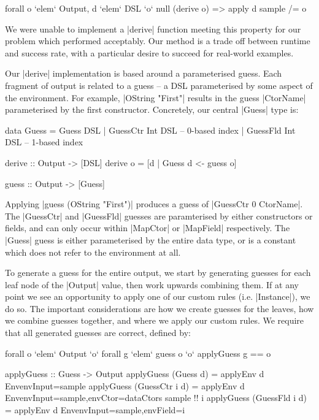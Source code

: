 \documentclass{llncs}
\begin{document}
\ignore\begin{code}
forall o `elem` Output, d `elem` DSL `o` null (derive o) => apply d sample /= o
\end{code}

We were unable to implement a |derive| function meeting this property for our problem which performed acceptably. Our method is a trade off between runtime and success rate, with a particular desire to succeed for real-world examples.

Our |derive| implementation is based around a parameterised guess. Each fragment of output is related to a guess -- a DSL parameterised by some aspect of the environment. For example, |OString "First"| results in the guess |CtorName| parameterised by the first constructor. Concretely, our central |Guess| type is:

\begin{code}
data Guess  =  Guess DSL
            |  GuessCtr Int DSL -- 0-based index
            |  GuessFld Int DSL -- 1-based index

derive :: Output -> [DSL]
derive o = [d | Guess d <- guess o]

guess :: Output -> [Guess]
\end{code}

Applying |guess (OString "First")| produces a guess of |GuessCtr 0 CtorName|. The |GuessCtr| and |GuessFld| guesses are paramterised by either constructors or fields, and can only occur within |MapCtor| or |MapField| respectively. The |Guess| guess is either parameterised by the entire data type, or is a constant which does not refer to the environment at all.

To generate a guess for the entire output, we start by generating guesses for each leaf node of the |Output| value, then work upwards combining them. If at any point we see an opportunity to apply one of our custom rules (i.e. |Instance|), we do so. The important considerations are how we create guesses for the leaves, how we combine guesses together, and where we apply our custom rules. We require that all generated guesses are correct, defined by:

\ignore\begin{code}
forall o `elem` Output `o` forall g `elem` guess o `o` applyGuess g == o
\end{code}
\begin{code}
applyGuess :: Guess -> Output
applyGuess (Guess       d) = applyEnv d
    Env{envInput=sample}
applyGuess (GuessCtr i  d) = applyEnv d
    Env{envInput=sample,envCtor=dataCtors sample !! i}
applyGuess (GuessFld i  d) = applyEnv d
    Env{envInput=sample,envField=i}
\end{code}
\end{document}
